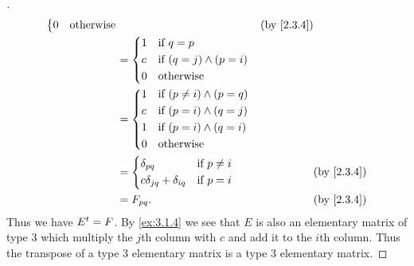 \begin{proof}[]
\begin{align*}
\begin{dcases}
                                                                0 & \text{otherwise}
                                                              \end{dcases}             &  & \text{(by \cref{2.3.4})}                             \\
                                                          & = \begin{dcases}
                                                                1 & \text{if } q = p                 \\
                                                                c & \text{if } (q = j) \land (p = i) \\
                                                                0 & \text{otherwise}
                                                              \end{dcases}                                               \\
                                                          & = \begin{dcases}
                                                                1 & \text{if } (p \neq i) \land (p = q) \\
                                                                c & \text{if } (p = i) \land (q = j)    \\
                                                                1 & \text{if } (p = i) \land (q = i)    \\
                                                                0 & \text{otherwise}
                                                              \end{dcases}                                            \\
                                                          & = \begin{dcases}
                                                                \delta_{p q}                  & \text{if } p \neq i \\
                                                                c \delta_{j q} + \delta_{i q} & \text{if } p = i
                                                              \end{dcases} &  & \text{(by \cref{2.3.4})}                                \\
                                                          & = F_{p q}.                                             &  & \text{(by \cref{2.3.4})}
  \end{align*}
  Thus we have \({E}^{t} = F\).
  By \cref{ex:3.1.4} we see that \(E\) is also an elementary matrix of type 3 which multiply the \(j\)th column with \(c\) and add it to the \(i\)th column.
  Thus the transpose of a type 3 elementary matrix is a type 3 elementary matrix.
\end{proof}

